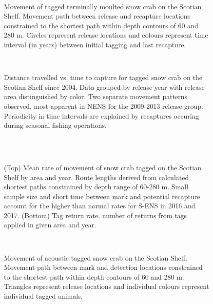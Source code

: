 \documentclass[11pt]{article}
\newcommand{\D}{.}
\newcommand{\h}{C:/} %
\newcommand{\es}{bio.data/bio.snowcrab/} %
\newcommand{\Ay}{assessments/2017/}
\begin{document}

\begin{figure}
\centering
{}\
\caption{Movement of tagged terminally moulted snow crab on the Scotian Shelf. Movement path between release and recapture locations constrained to the shortest path within depth contours of 60 and 280 m. Circles represent release locations and colours represent time interval (in years) between initial tagging and last recapture.}
\end{figure}
\clearpage



\begin{figure}
\centering
{}\
\caption{Distance travelled vs. time to capture for tagged snow crab on the Scotian Shelf since 2004. Data grouped by release year with release area distinguished by color. Two separate movement patterns observed, most apparent in NENS for the 2009-2013 release group. Periodicity in time intervals are explained by recaptures occuring during seasonal fishing operations.}
\end{figure}



\begin{figure}
    \centering
    \\
    \\
\caption{(Top) Mean rate of movement of snow crab tagged on the Scotian Shelf by area and year. Route lengths derived from calculated shortest paths constrained by depth range of 60-280 m. Small sample size and short time between mark and potential recapture account for the higher than normal rates for S-ENS in 2016 and 2017. (Bottom) Tag return rate, number of returns from tags applied in given area and year.}
\end{figure}
\clearpage



\begin{figure}
\centering
{}\
\caption{Movement of acoustic tagged snow crab on the Scotian Shelf. Movement path between mark and detection locations constrained to the shortest path within depth contours of 60 and 280 m. Triangles represent release locations and individual colours represent individual tagged animals.}
\end{figure}
\clearpage
\end{document}

